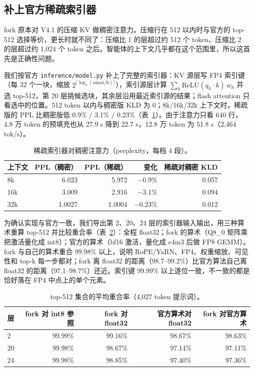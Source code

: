 \documentclass[11pt,a4paper]{article}
\newcommand{\code}[1]{\texttt{#1}}
\newcommand{\tps}{tok/s}
\begin{document}
\subsection{补上官方稀疏索引器}
\label{sec:indexer}

fork 原本对 V4.1 的压缩 KV 做稠密注意力。压缩行在 512 以内时与官方的 top-512 选择等价，更长时就不同了：压缩比 1 的层超过约 512 个 token、压缩比 2 的层超过约 1,024 个 token 之后。智能体的上下文几乎都在这个范围里，所以这首先是正确性问题。

我们按官方 \code{inference/model.py} 补上了完整的索引器：KV 源层写 FP4 索引键（每 32 个一块，缩放 $2^{\lceil \log_2(\mathrm{amax}/6) \rceil}$），索引源层计算 $\sum_h \mathrm{ReLU}(q_h \cdot k)\, w_h$ 并选 top-512，第 20 层挑候选块，其余层沿用最近索引源的结果；flash attention 只看选中的位置。512 token 以内与稠密版 KLD 为 0；8k/16k/32k 上下文时，稀疏版的 PPL 比稠密版低 0.9\% / 3.1\% / 0.23\%（表~\ref{tab:sparse}）。由于注意力只看 640 行，4.8 万 token 的预填充也从 27.9 s 降到 22.7 s，12.8 万 token 为 51.8 s（2,464 \tps{}）。

\begin{table}[h]
  \centering
  \small
  \caption{稀疏索引器对稠密注意力（perplexity，每档 4 段）。}
  \label{tab:sparse}
  \begin{tabular}{@{}l r r r r@{}}
    \toprule
    上下文 & PPL（稠密） & PPL（稀疏） & 变化 & 稀疏对稠密 KLD \\
    \midrule
    8k & 6.023 & 5.972 & $-0.9\%$ & 0.057 \\
    16k & 3.009 & 2.916 & $-3.1\%$ & 0.094 \\
    32k & 1.0027 & 1.0004 & $-0.23\%$ & 0.012 \\
    \bottomrule
  \end{tabular}
\end{table}

为确认实现与官方一致，我们导出第 2、20、24 层的索引器输入输出，用三种算术重算 top-512 并比较重合率（表~\ref{tab:oracle}）：全程 float32；fork 的算术（Q8\_0 矩阵乘把激活量化成 int8）；官方的算术（bf16 激活，量化成 e4m3 后做 FP8 GEMM）。fork 与自己的算术重合 99.98\% 以上，说明 RoPE/YaRN、FP4、权重缩放、可见性和 top-k 每一步都对；fork 离 float32 的距离（98.7--99.2\%）比官方算法自己离 float32 的距离（97.1--98.7\%）还近。索引键 99.99\% 以上逐位一致，不一致的都是恰好落在 FP4 中点上的单个元素。

\begin{table}[h]
  \centering
  \small
  \caption{top-512 集合的平均重合率（4,027 token 提示词）。}
  \label{tab:oracle}
  \begin{tabular}{@{}l r r r r@{}}
    \toprule
    层 & fork 对 int8 参照 & fork 对 float32 & 官方算术对 float32 & fork 对官方算术 \\
    \midrule
    2 & 99.99\% & 99.16\% & 98.67\% & 98.63\% \\
    20 & 99.98\% & 98.67\% & 97.14\% & 97.11\% \\
    24 & 99.98\% & 98.85\% & 97.40\% & 97.36\% \\
    \bottomrule
  \end{tabular}
\end{table}
\end{document}
